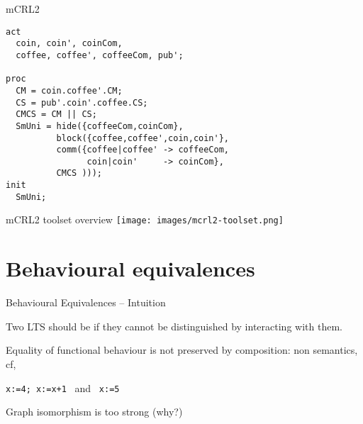 \documentclass{beamer}
\begin{document}
\begin{frame}[fragile]{mCRL2}
\small
  
\begin{lstlisting}
act
  coin, coin', coinCom,
  coffee, coffee', coffeeCom, pub';

proc
  CM = coin.coffee'.CM;
  CS = pub'.coin'.coffee.CS;
  CMCS = CM || CS;
  SmUni = hide({coffeeCom,coinCom},
          block({coffee,coffee',coin,coin'},
          comm({coffee|coffee' -> coffeeCom,
                coin|coin'     -> coinCom},
          CMCS )));
init
  SmUni;
\end{lstlisting}
\end{frame}

\begin{slide}{mCRL2 toolset overview}
  \texttt{[image: images/mcrl2-toolset.png]}
\end{slide}

\section{Behavioural equivalences}

\begin{slide}{Behavioural Equivalences -- Intuition}
\small


Two LTS should be  if they cannot be distinguished by interacting with them.


\begin{block}{Equality of functional behaviour}
is not preserved by  composition: non  semantics, cf,
\begin{center}
\texttt{x:=4; x:=x+1} ~and~ \texttt{x:=5}
\end{center}
\end{block}

\begin{block}{Graph isomorphism} 
is too strong (why?)
\end{block}

\end{slide}
\end{document}
